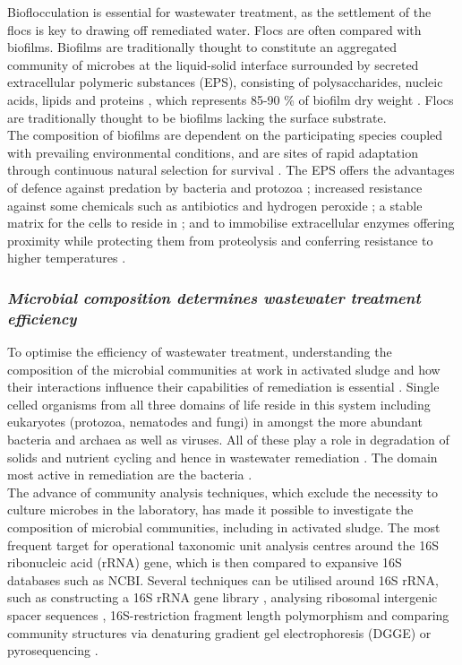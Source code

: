 \documentclass[twoside]{article}
\begin{document}
Bioflocculation is essential for wastewater treatment, as the settlement of the flocs is key to drawing off remediated water. Flocs are often compared with biofilms. Biofilms are traditionally thought to constitute an aggregated community of microbes at the liquid-solid interface surrounded by secreted extracellular polymeric substances (EPS), consisting of polysaccharides, nucleic acids, lipids and proteins \cite{wingender1999}, which represents 85-90 \% of biofilm dry weight \cite{Frolund_96}. Flocs are traditionally thought to be biofilms lacking the surface substrate.\\


The composition of biofilms are dependent on the participating species coupled with prevailing environmental conditions, and are sites of rapid adaptation through continuous natural selection for survival \cite{boles2008,matz2005,palmer2001}.  
The EPS offers the advantages of defence against predation by bacteria \cite{rao2005} and protozoa \cite{matz2005}; increased resistance against some chemicals such as antibiotics and hydrogen peroxide \cite{burmolle_06}; a stable matrix for the cells to reside in \cite{Flemming_10}; and to immobilise extracellular enzymes offering proximity while protecting them from proteolysis and conferring resistance to higher temperatures \cite{wingender2002extracellular,Flemming_10,skillman1998}.\\

\subsubsection{\emph{Microbial composition determines wastewater treatment efficiency}}
To optimise the efficiency of wastewater treatment, understanding the composition of the microbial communities at work in activated sludge and how their interactions influence their capabilities of remediation is essential \cite{daims2006}.
Single celled organisms from all three domains of life reside in this system including eukaryotes (protozoa, nematodes and fungi) in amongst the more abundant bacteria and archaea as well as viruses. All of these play a role in degradation of solids and nutrient cycling and hence in wastewater remediation \cite{muchie2010bioremediation}. The domain most active in remediation are the bacteria \cite{spellman2008handbook}.\\


The advance of community analysis techniques, which exclude the necessity to culture microbes in the laboratory, has made it possible to investigate the composition of microbial communities, including in activated sludge. The most frequent target for operational taxonomic unit analysis centres around the 16S ribonucleic acid (rRNA) gene, which is then compared to expansive 16S databases such as NCBI. Several techniques can be utilised around 16S rRNA, such as constructing a 16S rRNA gene library \cite{McGarvey_04}, analysing ribosomal intergenic spacer sequences \cite{Yu_01}, 16S-restriction fragment length polymorphism \cite{Gilbride_06} and comparing community structures via denaturing gradient gel electrophoresis (DGGE) \cite{Hesham_11} or pyrosequencing \cite{wang2012pyrosequencing}.\\
\end{document}
